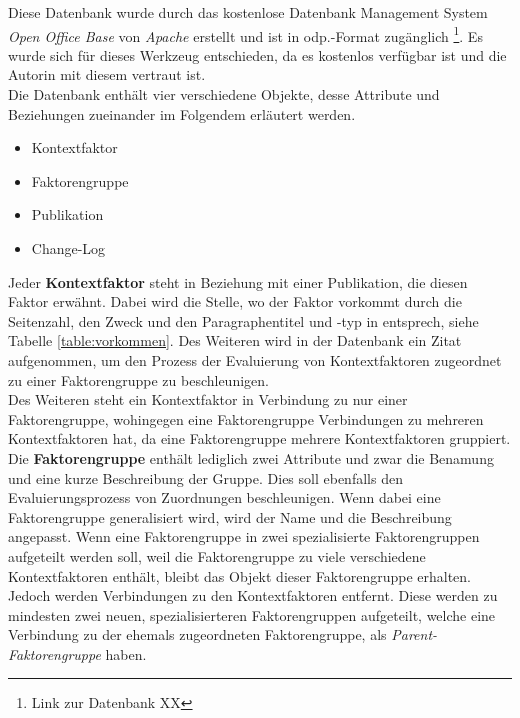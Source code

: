 Diese Datenbank wurde durch das kostenlose Datenbank Management System \textit{Open Office Base} von \textit{Apache} erstellt und ist in odp.-Format zugänglich \footnote{Link zur Datenbank XX}. Es wurde sich für dieses Werkzeug entschieden, da es kostenlos verfügbar ist und die Autorin mit diesem vertraut ist.\\

Die Datenbank enthält vier verschiedene Objekte, desse Attribute und Beziehungen zueinander im Folgendem erläutert werden.
\begin{itemize}
    \item Kontextfaktor
    \item Faktorengruppe
    \item Publikation
    \item Change-Log
\end{itemize}

Jeder \textbf{Kontextfaktor} steht in Beziehung mit einer Publikation, die diesen Faktor erwähnt. Dabei wird die Stelle, wo der Faktor vorkommt durch die Seitenzahl, den Zweck und den Paragraphentitel und -typ in entsprech, siehe Tabelle \ref{table:vorkommen}. 
Des Weiteren wird in der Datenbank ein Zitat aufgenommen, um den Prozess der Evaluierung von Kontextfaktoren zugeordnet zu einer Faktorengruppe zu beschleunigen. \\ 

Des Weiteren steht ein Kontextfaktor in Verbindung zu nur einer Faktorengruppe, wohingegen eine Faktorengruppe Verbindungen zu mehreren Kontextfaktoren hat, da eine Faktorengruppe mehrere Kontextfaktoren gruppiert. \\

Die \textbf{Faktorengruppe} enthält lediglich zwei Attribute und zwar die Benamung und eine kurze Beschreibung der Gruppe. Dies soll ebenfalls den Evaluierungsprozess von Zuordnungen beschleunigen. 
Wenn dabei eine Faktorengruppe generalisiert wird, wird der Name und die Beschreibung angepasst. Wenn eine Faktorengruppe in zwei spezialisierte Faktorengruppen aufgeteilt werden soll, weil die Faktorengruppe zu viele verschiedene Kontextfaktoren enthält, bleibt das Objekt dieser Faktorengruppe erhalten. Jedoch werden Verbindungen zu den Kontextfaktoren entfernt. Diese werden zu mindesten zwei neuen, spezialisierteren Faktorengruppen aufgeteilt, welche eine Verbindung zu der ehemals zugeordneten Faktorengruppe, als \textit{Parent-Faktorengruppe} haben. \\

